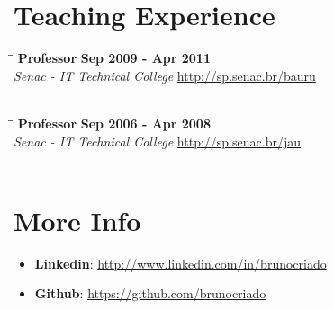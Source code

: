 \documentclass[margin]{res}
\begin{document}
\begin{resume}
\section{Teaching Experience}

\vspace{-0.1in}
\begin{tabbing}
  \hspace{2.3in}\= \hspace{1.7in}\= \kill %
  \textbf{Professor}    \>\>\textbf{Sep 2009 - Apr 2011}\\
  \textit{Senac - IT Technical College} \url{http://sp.senac.br/bauru}\\\\
\end{tabbing}\vspace{-20pt}      %

\vspace{-0.1in}
\begin{tabbing}
  \hspace{2.3in}\= \hspace{1.7in}\= \kill %
  \textbf{Professor}    \>\>\textbf{Sep 2006 - Apr 2008}\\
  \textit{Senac - IT Technical College} \url{http://sp.senac.br/jau}\\\\
\end{tabbing}\vspace{-20pt}      %




\section{More Info}
\begin{itemize}
\item \textbf{Linkedin}: \url{http://www.linkedin.com/in/brunocriado}
\item \textbf{Github}: \url{https://github.com/brunocriado}
\end{itemize}

\end{resume}
\end{document}
